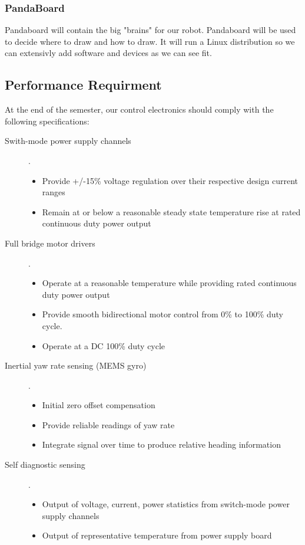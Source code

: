\documentclass[12pt]{article}
\begin{document}
     \subsubsection{PandaBoard}
     Pandaboard will contain the big "brains" for our robot. Pandaboard will be used to decide where to draw and how to draw. It will run a Linux distribution so we can extensivly add software and devices as we can see fit.
 \subsection{Performance Requirment}
 At the end of the semester, our control electronics should comply with the following specifications:
 \begin{description}
    \item[Swith-mode power supply channels]. 
    \begin{itemize}
       \item Provide +/-15\% voltage regulation over their respective design current ranges
       \item Remain at or below a reasonable steady state temperature rise at rated continuous duty power output
       \end{itemize}
    \item[Full bridge motor drivers]. 
    \begin{itemize}
       \item Operate at a reasonable temperature while providing rated continuous duty power output
      \item  Provide smooth bidirectional motor control from 0\% to 100\% duty cycle.
      \item Operate at a DC 100\% duty cycle
      \end{itemize}
    \item[Inertial yaw rate sensing (MEMS gyro)]. 
    \begin{itemize}
      \item Initial zero offset compensation 
      \item Provide reliable readings of yaw rate
      \item Integrate signal over time to produce relative heading information
      \end{itemize}
    \item[Self diagnostic sensing]. 
    \begin{itemize}
      \item Output of voltage, current, power statistics from switch-mode power supply channels
      \item Output of representative temperature from power supply board

\end{itemize}
\end{description}
\end{document}
